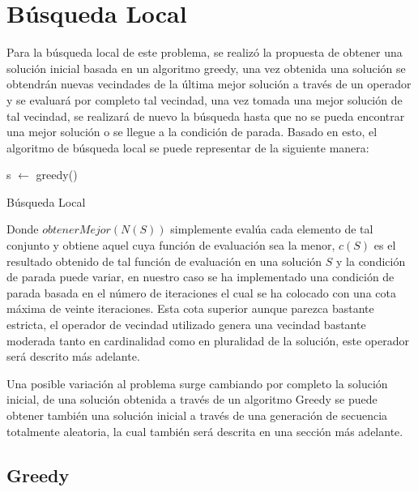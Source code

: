 \documentclass{ci5652}
\begin{document}
\section{Búsqueda Local}

  Para la búsqueda local de este problema, se realizó la propuesta de obtener una solución inicial basada en un algoritmo greedy, una vez obtenida una solución se obtendrán nuevas vecindades de la última mejor solución a través de un operador y se evaluará por completo tal vecindad, una vez tomada una mejor solución de tal vecindad, se realizará de nuevo la búsqueda hasta que no se pueda encontrar una mejor solución o se llegue a la condición de parada. Basado en esto, el algoritmo de búsqueda local se puede representar de la siguiente manera:
    
\begin{algorithm}
 \DontPrintSemicolon
 \vspace*{0.1cm}
 s $\leftarrow$ greedy()\;
 
 \vspace*{0.1cm}
 \caption{Búsqueda Local}
\end{algorithm}
    
  Donde \(obtenerMejor(N(S))\) simplemente evalúa cada elemento de tal conjunto y obtiene aquel cuya función de evaluación sea la menor, \(c(S)\) es el resultado obtenido de tal función de evaluación en una solución \(S\) y la condición de parada puede variar, en nuestro caso se ha implementado una condición de parada basada en el número de iteraciones el cual se ha colocado con una cota máxima de veinte iteraciones. Esta cota superior aunque parezca bastante estricta, el operador de vecindad utilizado genera una vecindad bastante moderada tanto en cardinalidad como en pluralidad de la solución, este operador será descrito más adelante. 
  
  Una posible variación al problema surge cambiando por completo la solución inicial, de una solución obtenida a través de un algoritmo Greedy se puede obtener también una solución inicial a través de una generación de secuencia totalmente aleatoria, la cual también será descrita en una sección más adelante.

\subsection{Greedy}
\end{document}
